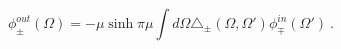 \begin{equation}\label{outin}
\phi^{out}_{\pm}(\Omega)=-\mu\sinh\pi\mu
\int d\Omega \triangle_{\pm}(\Omega,
\Omega')\phi^{in}_{\mp}(\Omega') \ .
\end{equation}

